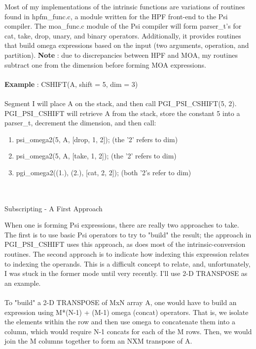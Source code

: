   Most of my implementations of the intrinsic functions are variations
  of routines found in hpfm_func.c, a module written for the HPF front-end
  to the Psi compiler.  The moa_func.c module of the Psi compiler
  will form parser_t's for cat, take, drop, unary, and binary operators.
  Additionally, it provides routines that build omega expressions based
  on the input (two arguments, operation, and partition).  {\bf Note } :
  due to discrepancies between HPF and MOA, my routines subtract one
  from the dimension before forming MOA expressions.\\ \\

  {\bf Example } :  CSHIFT(A, shift = 5, dim = 3)\\ \\

  Segment I will place A on the stack, and then call PGI_PSI_CSHIFT(5, 2).
  PGI_PSI_CSHIFT will retrieve A from the stack, store the constant 5
  into a parser_t, decrement the dimension, and then call:\\
  \begin{enumerate}
  \item psi_omega2(5, A, [drop, 1, 2]);  (the '2' refers to dim)
  \\
  \item psi_omega2(5, A, [take, 1, 2]); (the '2' refers to dim)
  \\
  \item pgi_omega2((1.), (2.), [cat, 2, 2]); (both '2's refer to dim)
  \end{enumerate} \\ \\

  Subscripting - A First Approach

  When one is forming Psi expressions, there are really two approaches to
  take.  The first is to use basic Psi operators to try to "build" the
  result; the approach in PGI_PSI_CSHIFT uses this approach, as does most
  of the intrinsic-conversion routines.  The second approach is to indicate
  how indexing this expression relates to indexing the operands.  This is
  a difficult concept to relate, and, unfortunately, I was stuck in the former
  mode until very recently.  I'll use 2-D TRANSPOSE as an example.\\ \\

  To "build" a 2-D TRANSPOSE of MxN array A, one would have to build an
  expression using M*(N-1) + (M-1) omega (concat) operators.  That is, we
  isolate the elements within the row and then use omega to concatenate
  them into a column, which would require N-1 concats for each of the M rows.
  Then, we would join the M columns together to form an NXM transpose of A.\\ \\

